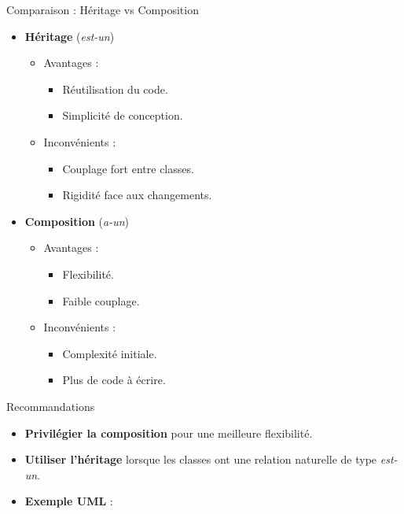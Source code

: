 \documentclass[aspectratio=169]{beamer}
\begin{document}
\begin{frame}{Comparaison : Héritage vs Composition}
    \begin{itemize}
        \item \textbf{Héritage} (\textit{est-un})
              \begin{itemize}
                  \item Avantages :
                        \begin{itemize}
                            \item Réutilisation du code.
                            \item Simplicité de conception.
                        \end{itemize}
                  \item Inconvénients :
                        \begin{itemize}
                            \item Couplage fort entre classes.
                            \item Rigidité face aux changements.
                        \end{itemize}
              \end{itemize}
        \item \textbf{Composition} (\textit{a-un})
              \begin{itemize}
                  \item Avantages :
                        \begin{itemize}
                            \item Flexibilité.
                            \item Faible couplage.
                        \end{itemize}
                  \item Inconvénients :
                        \begin{itemize}
                            \item Complexité initiale.
                            \item Plus de code à écrire.
                        \end{itemize}
              \end{itemize}
    \end{itemize}
\end{frame}

\begin{frame}{Recommandations}
    \begin{itemize}
        \item \textbf{Privilégier la composition} pour une meilleure flexibilité.
        \item \textbf{Utiliser l'héritage} lorsque les classes ont une relation naturelle de type \textit{est-un}.
        \item \textbf{Exemple UML} :
    \end{itemize}
\end{frame}
\end{document}
